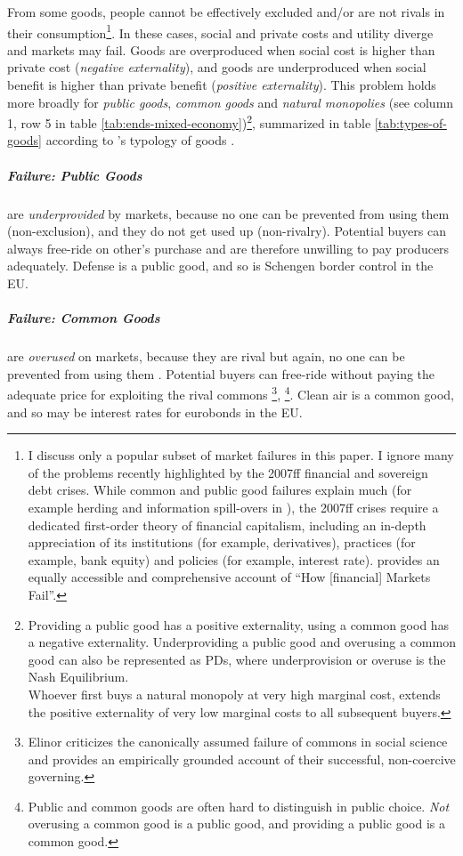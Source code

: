 From some goods, people cannot be effectively excluded and/or are not rivals in their consumption\footnote{
	I discuss only a popular subset of market failures in this paper. I ignore many of the problems recently highlighted by the 2007ff financial and sovereign debt crises. While common and public good failures explain much (for example herding and information spill-overs in \citealt{Banerjee-1992-aa}), the 2007ff crises require a dedicated first-order theory of financial capitalism, including an in-depth appreciation of its institutions (for example, derivatives), practices (for example, bank equity) and policies (for example, interest rate). \cite{Cassidy2010} provides an equally accessible and comprehensive account of ``How [financial] Markets Fail''.}. %
In these cases, social and private costs and utility diverge and markets may fail. Goods are overproduced when social cost is higher than private cost (\emph{negative externality}), and goods are underproduced when social benefit is higher than private benefit (\emph{positive externality}). This problem holds more broadly for \emph{public goods}, \emph{common goods} and \emph{natural monopolies} (see column 1, row 5 in table \ref{tab:ends-mixed-economy})\footnote{
	Providing a public good has a positive externality, using a common good has a negative externality. Underproviding a public good and overusing a common good can also be represented as \glspl{PD}, where underprovision or overuse is the Nash Equilibrium. \\ Whoever first buys a natural monopoly at very high marginal cost, extends the positive externality of very low marginal costs to all subsequent buyers.},
summarized in table \ref{tab:types-of-goods} according to \citeauthor{Samuelson-1954-eu}'s typology of goods \citeyearpar{Samuelson-1954-eu}.



\subparagraph{Failure: Public Goods}  \label{sec:public-good} are \emph{underprovided} by markets, because no one can be prevented from using them (non-exclusion), and they do not get used up (non-rivalry). Potential buyers can always free-ride on other's purchase and are therefore unwilling to pay producers adequately. Defense is a public good, and so is Schengen border control in the \gls{EU}.

\subparagraph{Failure: Common Goods}  \label{sec:common-good} are \emph{overused} on markets, because they are rival but again, no one can be prevented from using them \citep{Hardin-1968-aa}. Potential buyers can free-ride without paying the adequate price for exploiting the rival commons \citep{Hardin-1968-aa}
\footnote{
	Elinor \cite{Ostrom1990} criticizes the canonically assumed failure of commons in social science and provides an empirically grounded account of their successful, non-coercive governing.
},
\footnote{
	Public and common goods are often hard to distinguish in public choice.
	\emph{Not} overusing a common good is a public good, and providing a public good is a common good.
}.
Clean air is a common good, and so may be interest rates for eurobonds in the \gls{EU}.

